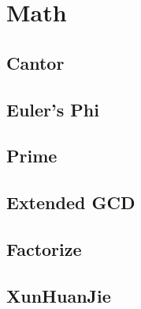 \section{Math}

\subsection{Cantor}


\subsection{Euler's Phi}


\subsection{Prime}


\subsection{Extended GCD}


\subsection{Factorize}


\subsection{XunHuanJie}



